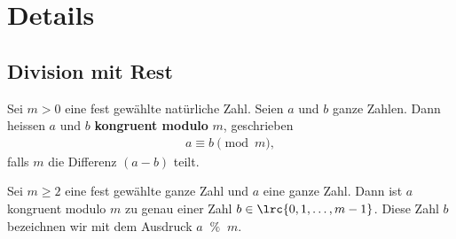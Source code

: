 \chapter{Details}\label{ch:Details}

\section{Division mit Rest}\label{sec:DivisionMitRest}
\begin{mydefinition}
Sei $m > 0$ eine fest gewählte natürliche Zahl. Seien $a$ und $b$ ganze Zahlen. Dann heissen $a$ und $b$ \textbf{kongruent modulo} $m$, geschrieben
\begin{align*}
	a \equiv b \pmod{m},
\end{align*}
falls $m$ die Differenz $(a - b)$ teilt.
\end{mydefinition}


\begin{mydefinition}
Sei $m \geq 2$ eine fest gewählte ganze Zahl und $a$ eine ganze Zahl. Dann ist $a$ kongruent modulo $m$ zu genau einer Zahl $b\in\lrc{0, 1, \ldots, m-1}$. Diese Zahl $b$ bezeichnen wir mit dem Ausdruck $a\; \;\%\; \; m$.
\end{mydefinition}

